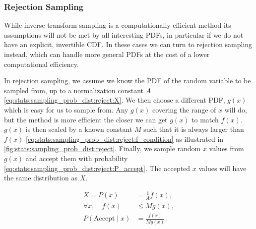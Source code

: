 \subsubsection{Rejection Sampling}
\label{additional:misc:sampling_prob_dist:reject}

While inverse transform sampling is a computationally efficient method
its assumptions will not be met by all interesting PDFs,
in particular if we do not have an explicit, invertible CDF.
In these cases we can turn to rejection sampling instead,
which can handle more general PDFs at the cost of a lower computational efficiency.

In rejection sampling, we assume we know the PDF of the random variable to be sampled from,
up to a normalization constant $A$ \cref{eq:stats:sampling_prob_dist:reject:X}.
We then choose a different PDF, $g\left(x\right)$ which is easy for us to sample from.
Any $g\left(x\right)$ covering the range of $x$ will do,
but the method is more efficient the closer we can get $g\left(x\right)$ to match $f\left(x\right)$.
$g\left(x\right)$ is then scaled by a known constant $M$
such that it is always larger than $f\left(x\right)$ \cref{eq:stats:sampling_prob_dist:reject:f_condition}
as illustrated in \cref{fig:stats:sampling_prob_dist:reject}.
Finally, we sample random $x$ values from $g\left(x\right)$ and accept them with probability \cref{eq:stats:sampling_prob_dist:reject:P_accept}.
The accepted $x$ values will have the same distribution as $X$.

\begin{subequations}\label{eq:stats:sampling_prob_dist:reject}
\begin{align}
X = P\left(x\right) &= \frac{1}{A} f\left(x\right), \label{eq:stats:sampling_prob_dist:reject:X} \\
\forall x, \quad f\left(x\right) & \leq M g\left(x\right), \label{eq:stats:sampling_prob_dist:reject:f_condition} \\
P\left(\text{Accept} \mid x\right) &= \frac{f\left(x\right)}{M g\left(x\right)}\,. \label{eq:stats:sampling_prob_dist:reject:P_accept}
\end{align}
\end{subequations}


